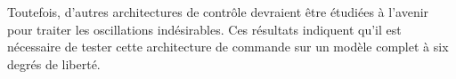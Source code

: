 Toutefois, d'autres architectures de contrôle devraient être étudiées à l'avenir pour traiter les oscillations indésirables. Ces résultats indiquent qu'il est nécessaire de tester cette architecture de commande sur un modèle complet à six degrés de liberté.





